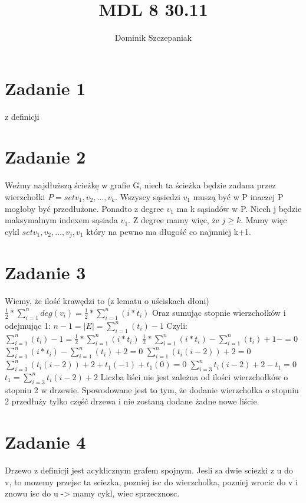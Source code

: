 \documentclass[12pt]{article}
\title{MDL 8 30.11}
\author{Dominik Szczepaniak}
\begin{document}
\maketitle

\bgroup\obeylines
\section{Zadanie 1}
z definicji 

\section{Zadanie 2}
Weźmy najdłuższą ścieżkę w grafie G, niech ta ścieżka będzie zadana przez wierzchołki $P = set{v_1, v_2, \dots, v_k}$.
Wszyscy sąsiedzi $v_1$ muszą być w P inaczej P mogłoby być przedłużone. Ponadto z degree $v_1$ ma k sąsiadów w P. Niech j będzie maksymalnym indexem sąsiada $v_1$. Z degree mamy więc, że $j \geq k$. Mamy więc cykl $set{v_1, v_2, \dots, v_j, v_1}$ który na pewno ma długość co najmniej k+1.
\section{Zadanie 3} 
Wiemy, że ilość krawędzi to (z lematu o uściskach dłoni) $\frac{1}{2} * \sum_{i=1}^n deg(v_i) = \frac{1}{2} * \sum_{i=1}^n (i * t_i)$
Oraz sumując stopnie wierzchołków i odejmując 1:
$n-1 = |E| = \sum_{i=1}^n (t_i) -1$
Czyli:
$\sum_{i=1}^n (t_i)-1 = \frac{1}{2} * \sum_{i=1}^n (i * t_i)$
$\frac{1}{2} * \sum_{i=1}^n (i * t_i) - \sum_{i=1}^n (t_i)+1 - = 0$
$\sum_{i=1}^n (i * t_i) - \sum_{i=1}^n (t_i)+2 = 0$
$\sum_{i=1}^n (t_i(i-2)) + 2 = 0$
$\sum_{i=3}^n (t_i(i-2)) + 2 + t_1(-1) + t_1(0) = 0$
$\sum_{i=3}^n t_i(i-2) + 2 - t_1 = 0$
$t_1 = \sum_{i=3}^n t_i(i-2) + 2$
Liczba liści nie jest zależna od ilości wierzchołków o stopniu 2 w drzewie. Spowodowane jest to tym, że dodanie wierzchołka o stopniu 2 przedłuży tylko część drzewa i nie zostaną dodane żadne nowe liście. 

\section{Zadanie 4}
Drzewo z definicji jest acyklicznym grafem spojnym. Jesli sa dwie sciezki z u do v, to mozemy przejsc ta sciezka, pozniej isc do wierzcholka, pozniej wrocic do v i znowu isc do u -> mamy cykl, wiec sprzecznosc.
\end{document}
